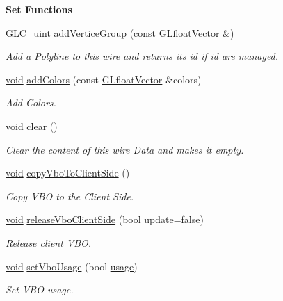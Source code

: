 \begin{Indent}{\bf Set Functions}\par
\begin{DoxyCompactItemize}
\item 
\hyperlink{glc__global_8h_abf950976fabed69026558df8e2da6c6b}{G\-L\-C\-\_\-uint} \hyperlink{class_g_l_c___wire_data_ad721898981fc389c9d9fe27479ea1776}{add\-Vertice\-Group} (const \hyperlink{glc__global_8h_a9f3f0b00cd127b066c9931b9c257a046}{G\-Lfloat\-Vector} \&)
\begin{DoxyCompactList}\small\item\em Add a Polyline to this wire and returns its id if id are managed. \end{DoxyCompactList}\item 
\hyperlink{group___u_a_v_objects_plugin_ga444cf2ff3f0ecbe028adce838d373f5c}{void} \hyperlink{class_g_l_c___wire_data_ac7e180fc617b410927dc1336a728c97a}{add\-Colors} (const \hyperlink{glc__global_8h_a9f3f0b00cd127b066c9931b9c257a046}{G\-Lfloat\-Vector} \&colors)
\begin{DoxyCompactList}\small\item\em Add Colors. \end{DoxyCompactList}\item 
\hyperlink{group___u_a_v_objects_plugin_ga444cf2ff3f0ecbe028adce838d373f5c}{void} \hyperlink{class_g_l_c___wire_data_a923c7b1cda30a3dfdda2179db9f99033}{clear} ()
\begin{DoxyCompactList}\small\item\em Clear the content of this wire Data and makes it empty. \end{DoxyCompactList}\item 
\hyperlink{group___u_a_v_objects_plugin_ga444cf2ff3f0ecbe028adce838d373f5c}{void} \hyperlink{class_g_l_c___wire_data_a645a77facc957bb854c1b7040e67498c}{copy\-Vbo\-To\-Client\-Side} ()
\begin{DoxyCompactList}\small\item\em Copy V\-B\-O to the Client Side. \end{DoxyCompactList}\item 
\hyperlink{group___u_a_v_objects_plugin_ga444cf2ff3f0ecbe028adce838d373f5c}{void} \hyperlink{class_g_l_c___wire_data_a3df31e6d36289f56ef121cba4b514b85}{release\-Vbo\-Client\-Side} (bool update=false)
\begin{DoxyCompactList}\small\item\em Release client V\-B\-O. \end{DoxyCompactList}\item 
\hyperlink{group___u_a_v_objects_plugin_ga444cf2ff3f0ecbe028adce838d373f5c}{void} \hyperlink{class_g_l_c___wire_data_a3379bc2d22b3dc7085d20ec69a93901b}{set\-Vbo\-Usage} (bool \hyperlink{glext_8h_ae759ed0394ed5353d8bef2fb755305da}{usage})
\begin{DoxyCompactList}\small\item\em Set V\-B\-O usage. \end{DoxyCompactList}\end{DoxyCompactItemize}
\end{Indent}
